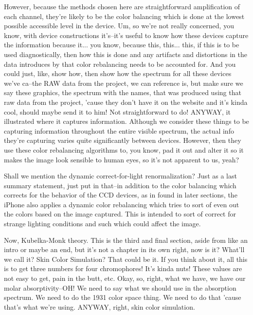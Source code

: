 However, because the methods chosen here are straightforward amplification of each channel, they're likely to be the color balancing which is done at the lowest possible accessible level in the device. Um, so we're not really concerned, you know, with device constructions it's--it's useful to know how these devices capture the information because it... you know, because this, this... this, if this is to be used diagnostically, then how this is done and any artifacts and distortions in the data introduces by that color rebalancing needs to be accounted for. And you could just, like, show how, then show how the spectrum for all these devices we've ca--the RAW data from the project, we can reference is, but make sure we say these graphics, the spectrum with the names, that was produced using that raw data from the project, 'cause they don't have it on the website and it's kinda cool, should maybe send it to him! Not straightforward to do! ANYWAY, it illustrated where it captures information. Although we consider these things to be capturing information throughout the entire visible spectrum, the actual info they're capturing varies quite significantly between devices. However, then they use these color rebalancing algorithms to, you know, pad it out and alter it so it makes the image look sensible to human eyes, so it's not apparent to us, yeah? 

Shall we mention the dynamic correct-for-light renormalization? Just as a last summary statement, just put in that--in addition to the color balancing which corrects for the behavior of the CCD devices, as in found in later sections, the iPhone also applies a dynamic color rebalancing which tries to sort of even out the colors based on the image captured. This is intended to sort of correct for strange lighting conditions and such which could affect the image.



Now, Kubelka-Monk theory. This is the third and final section, aside from like an intro or maybe an end, but it's not a chapter in its own right, now is it? What'll we call it? Skin Color Simulation? That could be it. If you think about it, all this is to get three numbers for four chromophores! It's kinda nuts! These values are not easy to get, pain in the butt, etc. Okay, so, right, what we have, we have our molar absorptivity--OH! We need to say what we should use in the absorption spectrum. We need to do the 1931 color space thing. We need to do that 'cause that's what we're using. ANYWAY, right, skin color simulation. 


